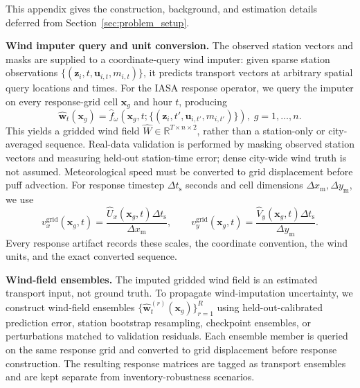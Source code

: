 This appendix gives the construction, background, and estimation details deferred
from Section~\ref{sec:problem_setup}.

\noindent\textbf{Wind imputer query and unit conversion.}
The observed station vectors and masks are supplied to a coordinate-query wind
imputer: given sparse station observations
\(\{(\mathbf z_i,t,\mathbf u_{i,t},m_{i,t})\}\), it predicts transport vectors
at arbitrary spatial query locations and times.  For the IASA response operator,
we query the imputer on every response-grid cell \(\mathbf x_g\) and hour
\(t\), producing
\begin{equation}
\widehat{\mathbf w}_t(\mathbf x_g)
=
\widehat f_{\omega}\!\left(\mathbf x_g,t;
\{(\mathbf z_i,t',\mathbf u_{i,t'},m_{i,t'})\}\right),
\; g=1,\ldots,n.
\label{eq:fieldformer_wind_field}
\end{equation}
This yields a gridded wind field
\(\widehat W\in\mathbb R^{T\times n\times 2}\), rather than a station-only or
city-averaged sequence.  Real-data validation is performed by masking observed
station vectors and measuring held-out station-time error; dense city-wide wind
truth is not assumed.  Meteorological speed must be converted to grid
displacement before puff advection.  For response timestep \(\Delta t_{\mathrm{s}}\)
seconds and cell dimensions \(\Delta x_{\mathrm{m}},\Delta y_{\mathrm{m}}\), we use
\begin{equation}
v_x^{\mathrm{grid}}(\mathbf x_g,t)
=
\frac{\widehat U_x(\mathbf x_g,t)\Delta t_{\mathrm{s}}}{\Delta x_{\mathrm{m}}},
\qquad
v_y^{\mathrm{grid}}(\mathbf x_g,t)
=
\frac{\widehat V_y(\mathbf x_g,t)\Delta t_{\mathrm{s}}}{\Delta y_{\mathrm{m}}}.
\label{eq:wind_unit_conversion}
\end{equation}
Every response artifact records these scales, the coordinate convention, the
wind units, and the exact converted sequence.

\noindent\textbf{Wind-field ensembles.}
The imputed gridded wind field is an estimated transport input, not ground truth.
To propagate wind-imputation uncertainty, we construct wind-field ensembles
\(\{\widehat{\mathbf w}^{(r)}_t(\mathbf x_g)\}_{r=1}^R\) using held-out-calibrated
prediction error, station bootstrap resampling, checkpoint ensembles, or
perturbations matched to validation residuals.  Each ensemble member is queried
on the same response grid and converted to grid displacement before response
construction.  The resulting response matrices are tagged as transport
ensembles and are kept separate from inventory-robustness scenarios.

